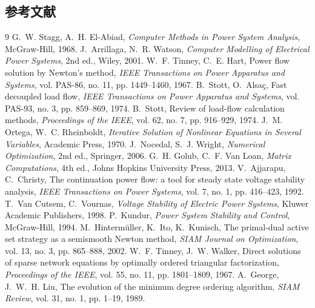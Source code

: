 \subsection{参考文献}
{\renewcommand{\section}[2]{}%
\begin{thebibliography}{9}\small
{} G.~W. Stagg, A.~H. El-Abiad, \emph{Computer Methods
in Power System Analysis}, McGraw-Hill, 1968.
 J.~Arrillaga, N.~R. Watson, \emph{Computer
Modelling of Electrical Power Systems}, 2nd ed., Wiley, 2001.
 W.~F. Tinney, C.~E. Hart, Power flow solution by
Newton's method, \emph{IEEE Transactions on Power Apparatus and Systems},
vol. PAS-86, no. 11, pp. 1449--1460, 1967.
 B.~Stott, O.~Alsa\c{c}, Fast decoupled load flow,
\emph{IEEE Transactions on Power Apparatus and Systems}, vol. PAS-93, no. 3,
pp. 859--869, 1974.
 B.~Stott, Review of load-flow calculation methods,
\emph{Proceedings of the IEEE}, vol. 62, no. 7, pp. 916--929, 1974.
 J.~M. Ortega, W.~C. Rheinboldt,
\emph{Iterative Solution of Nonlinear Equations in Several Variables},
Academic Press, 1970.
 J.~Nocedal, S.~J. Wright, \emph{Numerical
Optimization}, 2nd ed., Springer, 2006.
 G.~H. Golub, C.~F. Van Loan, \emph{Matrix
Computations}, 4th ed., Johns Hopkins University Press, 2013.
 V.~Ajjarapu, C.~Christy, The continuation power
flow: a tool for steady state voltage stability analysis, \emph{IEEE
Transactions on Power Systems}, vol. 7, no. 1, pp. 416--423, 1992.
 T.~Van Cutsem, C.~Vournas, \emph{Voltage
Stability of Electric Power Systems}, Kluwer Academic Publishers, 1998.
 P.~Kundur, \emph{Power System Stability and Control},
McGraw-Hill, 1994.
 M.~Hinterm\"uller, K.~Ito, K.~Kunisch, The
primal-dual active set strategy as a semismooth Newton method, \emph{SIAM
Journal on Optimization}, vol. 13, no. 3, pp. 865--888, 2002.
 W.~F. Tinney, J.~W. Walker, Direct solutions of
sparse network equations by optimally ordered triangular factorization,
\emph{Proceedings of the IEEE}, vol. 55, no. 11, pp. 1801--1809, 1967.
 A.~George, J.~W.~H. Liu, The evolution of the minimum
degree ordering algorithm, \emph{SIAM Review}, vol. 31, no. 1, pp. 1--19, 1989.

\end{thebibliography}}
